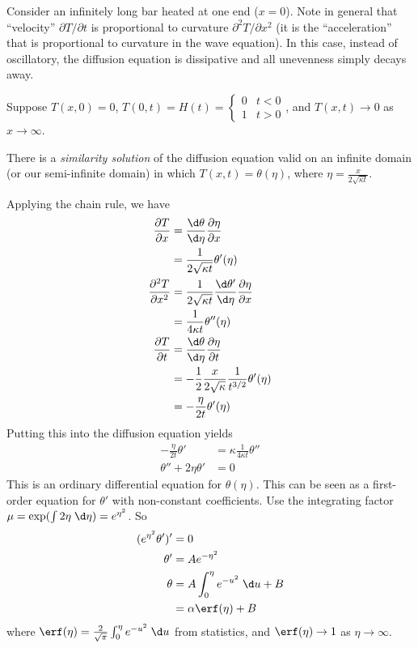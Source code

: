 \documentclass[a4paper]{article}
\begin{document}
\begin{eg}
  Consider an infinitely long bar heated at one end ($x = 0$). Note in general that ``velocity'' $\partial T/\partial t$ is proportional to curvature $\partial^2 T/\partial x^2$ (it is the ``acceleration'' that is proportional to curvature in the wave equation). In this case, instead of oscillatory, the diffusion equation is dissipative and all unevenness simply decays away.

Suppose $T(x,0) = 0$, $T(0, t) = H(t) = 
\begin{cases}
  0 & t < 0\\
  1 & t > 0
\end{cases}$, and $T(x, t)\to 0$ as $x\to \infty$.

There is a \emph{similarity solution} of the diffusion equation valid on an infinite domain (or our semi-infinite domain) in which $T(x, t) = \theta(\eta)$, where $\displaystyle \eta = \frac{x}{2\sqrt{\kappa t}}$.

Applying the chain rule, we have
\begin{align*}
  \frac{\partial T}{\partial x} &= \frac{\d \theta}{\d \eta} \frac{\partial \eta}{\partial x}\\
  &= \frac{1}{2\sqrt{\kappa t}} \theta'(\eta)\\
  \frac{\partial^2 T}{\partial x^2} &= \frac{1}{2\sqrt{\kappa t}} \frac{\d\theta'}{\d\eta}\frac{\partial \eta}{\partial x}\\
  &= \frac{1}{4\kappa t}\theta''(\eta)\\
  \frac{\partial T}{\partial t} &= \frac{\d \theta}{\d \eta}\frac{\partial \eta}{\partial t}\\
  &= -\frac{1}{2}\frac{x}{2\sqrt{\kappa}}\frac{1}{t^{3/2}} \theta'(\eta)\\
  &= -\frac{\eta}{2t}\theta'(\eta)
\end{align*}
Putting this into the diffusion equation yields
\begin{align*}
  -\frac{\eta}{2t}\theta' &= \kappa \frac{1}{4\kappa t}\theta''\\
  \theta'' + 2\eta\theta' &= 0
\end{align*}
This is an ordinary differential equation for $\theta(\eta)$. This can be seen as a first-order equation for $\theta'$ with non-constant coefficients. Use the integrating factor $\mu = \exp(\int 2\eta \;\d \eta) = e^{\eta^2}$. So
\begin{align*}
  (e^{\eta^2}\theta')' &= 0\\
  \theta' &= Ae^{-\eta^2}\\
  \theta &= A\int_0^\eta e^{-u^2}\;\d u + B\\
  &= \alpha\erf(\eta) + B
\end{align*}
where $\erf(\eta) = \frac{2}{\sqrt{\pi}} \int_0^\eta e^{-u^2}\;\d u$ from statistics, and $\erf(\eta)\to 1$ as $\eta\to \infty$.


\end{eg}
\end{document}
